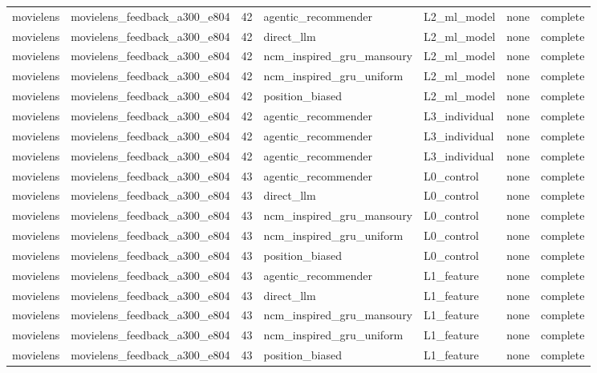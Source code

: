 \begin{table}[htbp!]
\begin{tabular}{llrllll}
movielens & movielens\_feedback\_a300\_e804 & 42 & agentic\_recommender & L2\_ml\_model & none & complete \\
movielens & movielens\_feedback\_a300\_e804 & 42 & direct\_llm & L2\_ml\_model & none & complete \\
movielens & movielens\_feedback\_a300\_e804 & 42 & ncm\_inspired\_gru\_mansoury & L2\_ml\_model & none & complete \\
movielens & movielens\_feedback\_a300\_e804 & 42 & ncm\_inspired\_gru\_uniform & L2\_ml\_model & none & complete \\
movielens & movielens\_feedback\_a300\_e804 & 42 & position\_biased & L2\_ml\_model & none & complete \\
movielens & movielens\_feedback\_a300\_e804 & 42 & agentic\_recommender & L3\_individual & none & complete \\
movielens & movielens\_feedback\_a300\_e804 & 42 & agentic\_recommender & L3\_individual & none & complete \\
movielens & movielens\_feedback\_a300\_e804 & 42 & agentic\_recommender & L3\_individual & none & complete \\
movielens & movielens\_feedback\_a300\_e804 & 43 & agentic\_recommender & L0\_control & none & complete \\
movielens & movielens\_feedback\_a300\_e804 & 43 & direct\_llm & L0\_control & none & complete \\
movielens & movielens\_feedback\_a300\_e804 & 43 & ncm\_inspired\_gru\_mansoury & L0\_control & none & complete \\
movielens & movielens\_feedback\_a300\_e804 & 43 & ncm\_inspired\_gru\_uniform & L0\_control & none & complete \\
movielens & movielens\_feedback\_a300\_e804 & 43 & position\_biased & L0\_control & none & complete \\
movielens & movielens\_feedback\_a300\_e804 & 43 & agentic\_recommender & L1\_feature & none & complete \\
movielens & movielens\_feedback\_a300\_e804 & 43 & direct\_llm & L1\_feature & none & complete \\
movielens & movielens\_feedback\_a300\_e804 & 43 & ncm\_inspired\_gru\_mansoury & L1\_feature & none & complete \\
movielens & movielens\_feedback\_a300\_e804 & 43 & ncm\_inspired\_gru\_uniform & L1\_feature & none & complete \\
movielens & movielens\_feedback\_a300\_e804 & 43 & position\_biased & L1\_feature & none & complete \\

\end{tabular}
\end{table}
